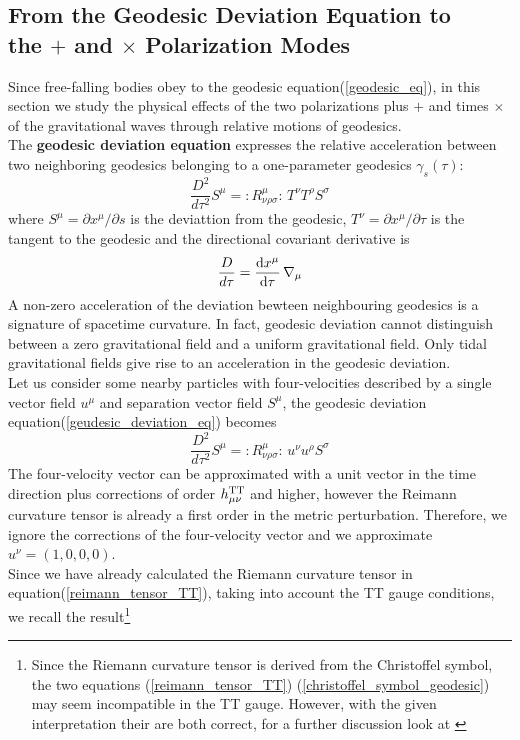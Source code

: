 \subsection{From the Geodesic Deviation Equation to \\the $+$ and $\times$ Polarization Modes}
Since free-falling bodies obey to the geodesic equation(\ref{geodesic_eq}), in this section we study the physical effects of the two polarizations plus $+$ and times $\times$ of the gravitational waves through relative motions of geodesics.\\
The \textbf{geodesic deviation equation}  expresses the relative acceleration between two neighboring geodesics belonging to a one-parameter geodesics $\gamma_s (\tau)$:
\begin{equation}
\label{geudesic_deviation_eq}
\dfrac{D^2}{d \tau ^2} S^{\mu} = :R^{\mu} _{\nu \rho \sigma}: \, T^{\nu} T^{\rho} S^{\sigma}
\end{equation}
 where $S^{\mu} = \partial x^{\mu} / \partial s$ is the deviattion from the geodesic, $T^{\nu} = \partial x^{\mu} / \partial \tau$ is the tangent to the geodesic and the directional covariant derivative is 
\[
\dfrac{D}{d \tau} = \dv{x^{\mu}}{\tau} \, \nabla_{\mu}
\]
A non-zero acceleration of the deviation bewteen neighbouring geodesics is a signature of spacetime curvature.
In fact, geodesic deviation cannot distinguish between a zero gravitational field and a uniform gravitational field. 
Only tidal gravitational fields give rise to an acceleration in the geodesic deviation. \\
Let us consider some nearby particles with four-velocities described by a single vector field $u^{\mu}$ and separation vector field $S^{\mu}$, the geodesic deviation equation(\ref{geudesic_deviation_eq}) becomes
\begin{equation}
\dfrac{D^2}{d \tau ^2} S^{\mu} = :R^{\mu} _{\nu \rho \sigma}: \, u^{\nu} u^{\rho} S^{\sigma}
\end{equation}
The four-velocity vector can be approximated with a unit vector in the time direction plus corrections of order $h^{\text{TT}} _{\mu \nu}$ and higher, however the Reimann curvature tensor is already a first order in the metric perturbation. 
Therefore, we ignore the corrections of the four-velocity vector and we approximate $u^{\nu} =(1,0,0,0)$.\\
Since we have already calculated the Riemann curvature tensor in equation(\ref{reimann_tensor_TT}), taking into account the TT gauge conditions, we recall the result\footnote{Since the Riemann curvature tensor is derived from the Christoffel symbol, the two equations (\ref{reimann_tensor_TT}) (\ref{christoffel_symbol_geodesic}) may seem  incompatible in the TT gauge. However, with the given interpretation their are both correct, for a further discussion look at \cite{leclercGeodesicDeviationGravitational2006}}
